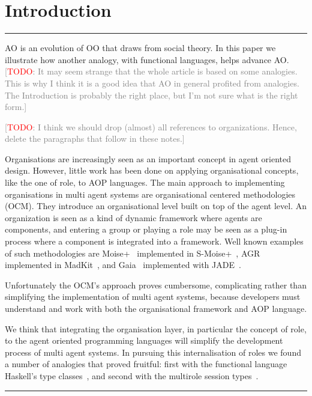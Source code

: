 \documentclass[conference,compsoc]{IEEEtran} %
\newcommand{\todo}[1]{{\small \textcolor{gray}{[\textcolor{red}{TODO}: #1]}}}
\newenvironment{notes}{\medskip\hrule\nobreak\smallskip\narrower}{\smallskip\hrule\medskip}
\begin{document}
\section{Introduction} %

\begin{notes}
AO is an evolution of OO that draws from social theory. In this paper we
illustrate how another analogy, with functional languages, helps advance 
AO\null. \todo{It may seem strange that the whole article is based on some
analogies. This is why I think it is a good idea that AO in general
profited from analogies. The Introduction is probably the right place, but
I'm not sure what is the right form.}

\todo{I think we should drop (almost) all references to organizations.
Hence, delete the paragraphs that follow in these notes.}

Organisations are increasingly seen as an important concept in agent
oriented design. However, little work has been done on applying
organisational concepts, like the one of role, to AOP languages. The main
approach to implementing organisations in multi agent systems are
organisational centered methodologies (OCM). They introduce an
organisational level built on top of the agent level. An organization is
seen as a kind of dynamic framework where agents are components, and
entering a group or playing a role may be seen as a plug-in process where a
component is integrated into a framework. Well known examples of such
methodologies are Moise+~\cite{DBLP:conf/atal/HubnerSB05} implemented in
S-Moise+~\cite{DBLP:conf/atal/HubnerSB05},
AGR~\cite{DBLP:conf/aose/FerberGM03} implemented in
MadKit~\cite{DBLP:conf/agents/GutknechtF00a}, and
Gaia~\cite{DBLP:journals/tosem/ZambonelliJW03} implemented with
JADE~\cite{DBLP:conf/jit/MoraitisPS02}.

Unfortunately the OCM's approach proves cumbersome, complicating rather
than simplifying the implementation of multi agent systems, because
developers must understand and work with both the organisational framework
and AOP language.

We think that integrating the organisation layer, in particular the concept
of role, to the agent oriented programming languages will simplify the
development process of multi agent systems. In pursuing this
internalisation of roles we found a number of analogies that proved
fruitful: first with the functional language Haskell's type
classes~\cite{}, and second with the multirole session types~\cite{}.  
\end{notes}
\end{document}
